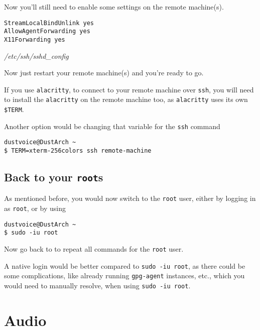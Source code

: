 \documentclass[10pt]{dustdoc}
\begin{document}
Now you’ll still need to enable some settings on the remote machine(s).

\begin{mintedlisting}
    \begin{verbatim}
StreamLocalBindUnlink yes
AllowAgentForwarding yes
X11Forwarding yes
    \end{verbatim}

    \caption{\textit{/etc/ssh/sshd\_config}}
\end{mintedlisting}

Now just restart your remote machine(s) and you’re ready to go.

\begin{NOTE}
    If you use \texttt{alacritty}, to connect to your remote machine over \texttt{ssh}, you will need to install the \texttt{alacritty} on the remote machine too, as \texttt{alacritty} uses its own \texttt{\$TERM}.

    Another option would be changing that variable for the \texttt{ssh} command

    \begin{verbatim}
dustvoice@DustArch ~
$ TERM=xterm-256colors ssh remote-machine
    \end{verbatim}
\end{NOTE}

\subsection{Back to your \texttt{root}s}
\label{sec:back-to-your-roots}

As mentioned before, you would now switch to the \texttt{root} user, either by logging in as \texttt{root}, or by using

\begin{verbatim}
dustvoice@DustArch ~
$ sudo -iu root
\end{verbatim}

Now go back to  to repeat all commands for the \texttt{root} user.

\begin{WARNING}
    A native login would be better compared to \texttt{sudo -iu root}, as there could be some complications, like already running \texttt{gpg-agent} instances, etc., which you would need to manually resolve, when using \texttt{sudo -iu root}.
\end{WARNING}

\section{Audio}
\label{sec:audio}
\end{document}

